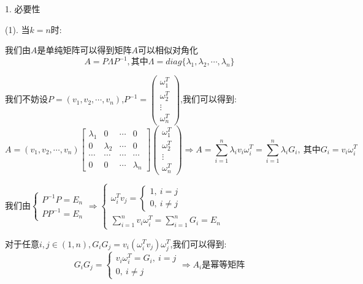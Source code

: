 \begin{anymark}[证明]
	1. 必要性
	 
	(1). 当$k=n$时:  
	
	我们由$A$是单纯矩阵可以得到矩阵$A$可以相似对角化
	$$A=P\Lambda P^{-1},\text{其中}\Lambda=diag\{\lambda_{1},\lambda_{2},\cdots,\lambda_{n}\}$$
	
	我们不妨设$P=(v_{1},v_{2},\cdots,v_{n})$,$P^{-1}=\left( \begin{matrix}
		\omega_{1}^{T}\\\omega_{2}^{T}\\ \vdots\\\omega_{n}^{T}
	\end{matrix}\right) $,我们可以得到:  
	$$A=(v_{1},v_{2},\cdots,v_{n})\left[\begin{matrix}
		\lambda_{1}&0&\cdots&0\\
		0&\lambda_{2}&\cdots&0\\
		\cdots&\cdots&\cdots&\cdots\\
		0&0&\cdots&\lambda_{n}
	\end{matrix} \right] \left( \begin{matrix}
		\omega_{1}^{T}\\\omega_{2}^{T}\\ \vdots\\\omega_{n}^{T}
	\end{matrix}\right) \Rightarrow A=\sum\limits_{i=1}^{n}\lambda_{i}v_{i}\omega_{i}^{T}=\sum\limits_{i=1}^{n}\lambda_{i}G_{i},\ \text{其中}G_{i}=v_{i}\omega_{i}^{T}$$
	
	我们由$\left\lbrace
	\begin{array}{l}
		P^{-1}P=E_{n}\\
		PP^{-1}=E_{n}
	\end{array}
	\right.\Rightarrow\left\lbrace
	\begin{array}{l}
		\omega_{i}^{T}v_{j}=\left\lbrace
		\begin{array}{l}
			1,\ i=j\\
			0,\ i\neq j
		\end{array}
		\right. \\
		\sum\limits_{i=1}^{n}v_{i}\omega_{i}^{T}=\sum\limits_{i=1}^{n}G_{i}=E_{n}
	\end{array}
	\right.$
	
	对于任意$i,j\in(1,n),G_{i}G_{j}=v_{i}(\omega_{i}^{T}v_{j})\omega_{j}^{T}$,我们可以得到:  
	$$G_{i}G_{j}=\left\lbrace
	\begin{array}{l}
		v_{i}\omega_{i}^{T}=G_{i},\ i=j\\
		0,\ i\neq j
	\end{array}
	\right. \Rightarrow A_{i}\text{是幂等矩阵}$$
	

\end{anymark}
